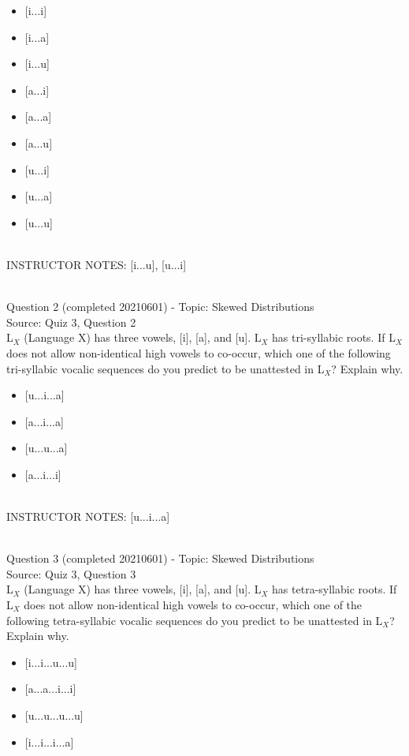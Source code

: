 \documentclass[12pt]{article}
\begin{document}
\begin{itemize} \item {[i...i]} \item {[i...a]} \item {[i...u]} \item {[a...i]} \item {[a...a]} \item {[a...u]} \item {[u...i]} \item {[u...a]} \item {[u...u]} \end{itemize}


~\\
INSTRUCTOR NOTES: [i...u], [u...i]


~\\

{\large Question 2} (completed 20210601) - Topic: Skewed Distributions\\
Source: Quiz 3, Question 2\\

L$_X$ (Language X) has three vowels, [i], [a], and [u]. L$_X$ has tri-syllabic roots. If L$_X$ does not allow non-identical high vowels to co-occur, which one of the following tri-syllabic vocalic sequences do you predict to be unattested in L$_X$? Explain why.\\

\begin{itemize} \item {[u...i...a]} \item {[a...i...a]} \item {[u...u...a]} \item {[a...i...i]} \end{itemize}


~\\
INSTRUCTOR NOTES: [u...i...a]


~\\

{\large Question 3} (completed 20210601) - Topic: Skewed Distributions\\
Source: Quiz 3, Question 3\\

L$_X$ (Language X) has three vowels, [i], [a], and [u]. L$_X$ has tetra-syllabic roots. If L$_X$ does not allow non-identical high vowels to co-occur, which one of the following tetra-syllabic vocalic sequences do you predict to be unattested in L$_X$? Explain why.\\

\begin{itemize} \item {[i...i...u...u]} \item {[a...a...i...i]} \item {[u...u...u...u]} \item {[i...i...i...a]} \end{itemize}
\end{document}
